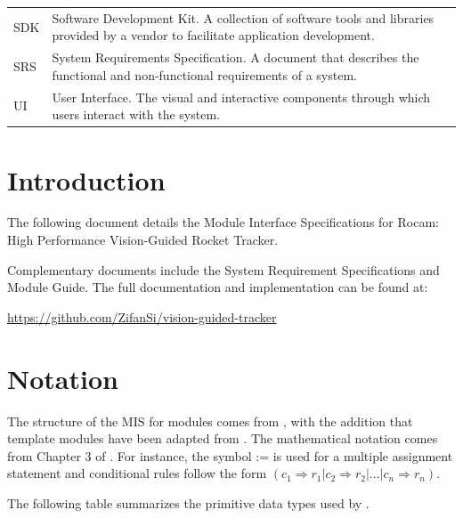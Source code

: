 \documentclass[12pt, titlepage]{article}
\begin{document}
\begin{table}[h]
\begin{tabular}{p{3cm} p{10cm}}
    SDK                   & Software Development Kit. A collection of software tools and libraries provided by a vendor to facilitate application development.                                   \\
    SRS                   & System Requirements Specification. A document that describes the functional and non-functional requirements of a system.                                             \\
    UI                    & User Interface. The visual and interactive components through which users interact with the system.                                                                  \\
    \bottomrule
  \end{tabular}
\end{table}

\newpage

\tableofcontents

\newpage


\section{Introduction}

The following document details the Module Interface Specifications for Rocam:
High Performance Vision-Guided Rocket Tracker.

Complementary documents include the System Requirement Specifications and
Module Guide. The full documentation and implementation can be found at:

\href{https://github.com/ZifanSi/vision-guided-tracker}{https://github.com/ZifanSi/vision-guided-tracker}

\section{Notation}

The structure of the MIS for modules comes from \citet{HoffmanAndStrooper1995},
with the addition that template modules have been adapted from
\cite{GhezziEtAl2003}. The mathematical notation comes from Chapter 3 of
\citet{HoffmanAndStrooper1995}. For instance, the symbol := is used for a
multiple assignment statement and conditional rules follow the form $(c_1
  \Rightarrow r_1 | c_2 \Rightarrow r_2 | ... | c_n \Rightarrow r_n )$.

The following table summarizes the primitive data types used by \progname.
\end{document}
